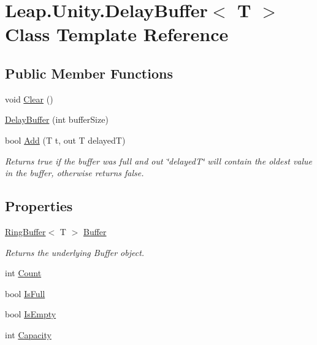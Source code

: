\hypertarget{class_leap_1_1_unity_1_1_delay_buffer}{}\section{Leap.\+Unity.\+Delay\+Buffer$<$ T $>$ Class Template Reference}
\label{class_leap_1_1_unity_1_1_delay_buffer}
\subsection*{Public Member Functions}
\begin{DoxyCompactItemize}
\item 
void \mbox{\hyperlink{class_leap_1_1_unity_1_1_delay_buffer_a09e508932731b3c33b43e26b1d795823}{Clear}} ()
\item 
\mbox{\hyperlink{class_leap_1_1_unity_1_1_delay_buffer_a10eed58fb6d51416e450e18391772b7c}{Delay\+Buffer}} (int buffer\+Size)
\item 
bool \mbox{\hyperlink{class_leap_1_1_unity_1_1_delay_buffer_ae48442ee7dec38f4fe032bba4da5267c}{Add}} (T t, out T delayedT)
\begin{DoxyCompactList}\small\item\em Returns true if the buffer was full and out \char`\"{}delayed\+T\char`\"{} will contain the oldest value in the buffer, otherwise returns false. \end{DoxyCompactList}\end{DoxyCompactItemize}
\subsection*{Properties}
\begin{DoxyCompactItemize}
\item 
\mbox{\hyperlink{class_leap_1_1_unity_1_1_ring_buffer}{Ring\+Buffer}}$<$ T $>$ \mbox{\hyperlink{class_leap_1_1_unity_1_1_delay_buffer_a75f215dccf141ab56b4b026ffa007753}{Buffer}}
\begin{DoxyCompactList}\small\item\em Returns the underlying Buffer object. \end{DoxyCompactList}\item 
int \mbox{\hyperlink{class_leap_1_1_unity_1_1_delay_buffer_ac48911eac8621e0275d2fced8c60c82e}{Count}}
\item 
bool \mbox{\hyperlink{class_leap_1_1_unity_1_1_delay_buffer_a1d20ce418e05b09619a0f6629c43e0d4}{Is\+Full}}
\item 
bool \mbox{\hyperlink{class_leap_1_1_unity_1_1_delay_buffer_a0a7cad7f8bff21c94572b28931f008c5}{Is\+Empty}}
\item 
int \mbox{\hyperlink{class_leap_1_1_unity_1_1_delay_buffer_abe5df937e0f6a1fa0b5e12a77caeab35}{Capacity}}
\end{DoxyCompactItemize}


